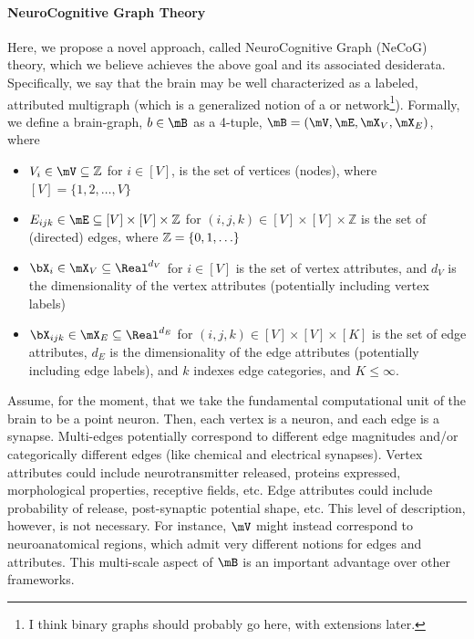 \paragraph{NeuroCognitive Graph Theory}

Here, we propose a novel approach, called NeuroCognitive Graph (NeCoG) theory, which we believe achieves the above goal and its associated desiderata.  Specifically, we say that the brain may be well characterized as a labeled, attributed multigraph (which is a generalized notion of a or network\footnote{I think binary graphs should probably go here, with extensions later.}).  Formally, we define a brain-graph, $b\in \mB$ as a 4-tuple, $\mB=(\mV,\mE,\mX_V, \mX_E)$, where

\begin{itemize}
	\item $V_i \in \mV \subseteq \mathbb{Z}$ for $i \in [V]$, is the set of vertices (nodes), where $[V]=\{1,2,\ldots,V\}$ 
	\item $E_{ijk} \in \mE \subseteq [V] \times [V] \times \mathbb{Z}$ for $(i,j,k) \in [V] \times [V] \times \mathbb{Z}$ is the set of (directed) edges, where $\mathbb{Z}=\{0,1,\ldots\}$
	\item $\bX_i \in \mX_V \subseteq \Real^{d_V}$ for $i \in [V]$ is the set of vertex attributes, and $d_V$ is the dimensionality of the vertex attributes (potentially including vertex labels)
	\item $\bX_{ijk} \in \mX_E \subseteq \Real^{d_E}$ for $(i,j,k) \in [V] \times [V] \times [K]$ is the set of edge attributes, $d_E$ is the dimensionality of the edge attributes (potentially including edge labels), and $k$ indexes edge categories, and $K \leq \infty$.
\end{itemize}


Assume, for the moment, that we take the fundamental computational unit of the brain to be a point neuron.  Then, each vertex is a neuron, and each edge is a synapse.   Multi-edges potentially correspond to different edge magnitudes and/or categorically different edges (like chemical and electrical synapses). Vertex attributes could include neurotransmitter released, proteins expressed, morphological properties, receptive fields, etc.  Edge attributes could include probability of release, post-synaptic potential shape, etc.  This level of description, however, is not necessary.  For instance, $\mV$ might instead correspond to neuroanatomical regions, which admit very different notions for edges and attributes.  This multi-scale aspect of $\mB$ is an important advantage over other frameworks.  

